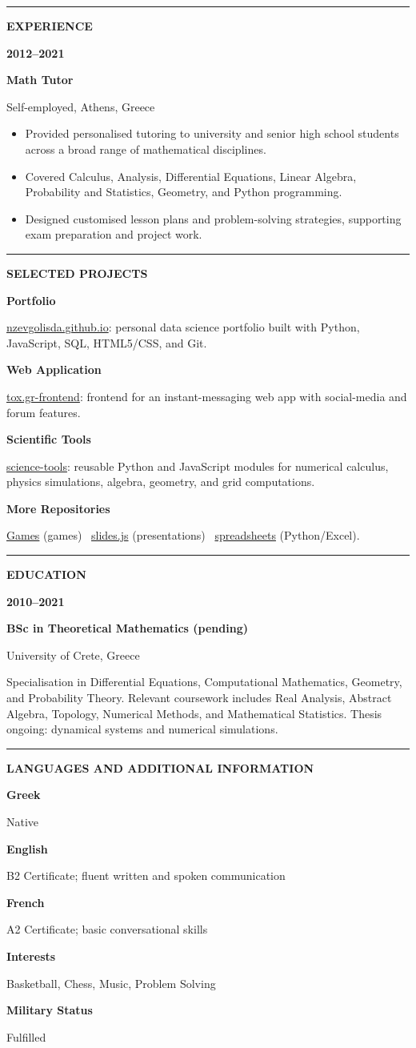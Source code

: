 \documentclass[10pt,a4paper]{article}
\newcommand{\sectiontitle}[1]{%
    \vspace{0.46em}%
    {\color{accent}\rule{0.08\textwidth}{1.4pt}}\hspace{0.55em}%
    {\small\bfseries\color{ink}\MakeUppercase{#1}}\par
    \vspace{0.22em}
}
\newcommand{\cvrow}[2]{%
    {\small\bfseries\color{accent}#1}\par
    {\small\color{ink}#2}\par\vspace{0.1em}
}
\newcommand{\entry}[4]{%
    {\small\bfseries\color{accent}#1}\par
    {\bfseries\color{ink}#2}\par
    {\small\color{muted}#3, #4}\par\vspace{0.1em}
}
\begin{document}
\sectiontitle{Experience}
\entry{2012--2021}{Math Tutor}{Self-employed}{Athens, Greece}
\begin{itemize}
    \item Provided personalised tutoring to university and senior high school students across a broad range of mathematical disciplines.
    \item Covered Calculus, Analysis, Differential Equations, Linear Algebra, Probability and Statistics, Geometry, and Python programming.
    \item Designed customised lesson plans and problem-solving strategies, supporting exam preparation and project work.
\end{itemize}

\sectiontitle{Selected Projects}
\cvrow{Portfolio}{\href{https://nzevgolisda.github.io/}{nzevgolisda.github.io}: personal data science portfolio built with Python, JavaScript, SQL, HTML5/CSS, and Git.}
\cvrow{Web Application}{\href{https://github.com/nzevgolisda/tox.gr-frontend}{tox.gr-frontend}: frontend for an instant-messaging web app with social-media and forum features.}
\cvrow{Scientific Tools}{\href{https://github.com/nzevgolisda/science-tools}{science-tools}: reusable Python and JavaScript modules for numerical calculus, physics simulations, algebra, geometry, and grid computations.}
\cvrow{More Repositories}{\href{https://github.com/nzevgolisda/Games}{Games} (games) \textbullet\ \href{https://github.com/nzevgolisda/slides.js}{slides.js} (presentations) \textbullet\ \href{https://github.com/nzevgolisda/spreadsheets}{spreadsheets} (Python/Excel).}

\sectiontitle{Education}
\entry{2010--2021}{BSc in Theoretical Mathematics (pending)}{University of Crete}{Greece}
Specialisation in Differential Equations, Computational Mathematics, Geometry, and Probability Theory. Relevant coursework includes Real Analysis, Abstract Algebra, Topology, Numerical Methods, and Mathematical Statistics. Thesis ongoing: dynamical systems and numerical simulations.

\sectiontitle{Languages and Additional Information}
\cvrow{Greek}{Native}
\cvrow{English}{B2 Certificate; fluent written and spoken communication}
\cvrow{French}{A2 Certificate; basic conversational skills}
\cvrow{Interests}{Basketball, Chess, Music, Problem Solving}\vspace{0.1em}
\cvrow{Military Status}{Fulfilled}
\end{document}
